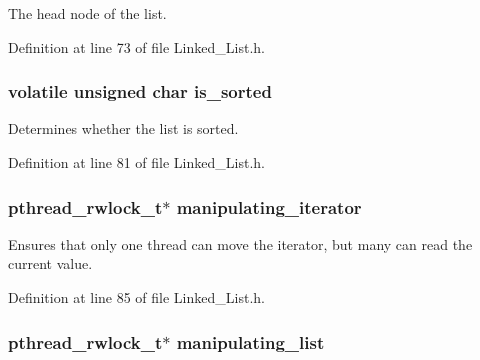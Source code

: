 The head node of the list. 



Definition at line 73 of file Linked\+\_\+\+List.\+h.

\hypertarget{struct_linked___list__t_a98bae05ea50779d556f7cd282cc8d9bc}{}
\subsubsection[{is\+\_\+sorted}]{\setlength{\rightskip}{0pt plus 5cm}volatile unsigned char is\+\_\+sorted}\label{struct_linked___list__t_a98bae05ea50779d556f7cd282cc8d9bc}


Determines whether the list is sorted. 



Definition at line 81 of file Linked\+\_\+\+List.\+h.

\hypertarget{struct_linked___list__t_ab73ab76aa0810bf72d2d60a1808f91c8}{}
\subsubsection[{manipulating\+\_\+iterator}]{\setlength{\rightskip}{0pt plus 5cm}pthread\+\_\+rwlock\+\_\+t$\ast$ manipulating\+\_\+iterator}\label{struct_linked___list__t_ab73ab76aa0810bf72d2d60a1808f91c8}


Ensures that only one thread can move the iterator, but many can read the current value. 



Definition at line 85 of file Linked\+\_\+\+List.\+h.

\hypertarget{struct_linked___list__t_ad9a141f7ed99410b5961e2a2bf998f81}{}
\subsubsection[{manipulating\+\_\+list}]{\setlength{\rightskip}{0pt plus 5cm}pthread\+\_\+rwlock\+\_\+t$\ast$ manipulating\+\_\+list}\label{struct_linked___list__t_ad9a141f7ed99410b5961e2a2bf998f81}


